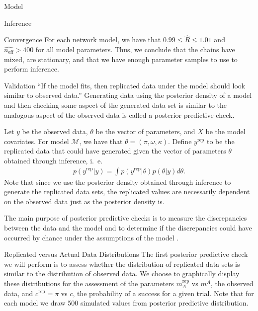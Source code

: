 \begin{chapter}{Model}
\begin{section}{Inference}
\begin{subsection}{Convergence}
    For each network model, we have that $0.99 \leq \hat{R} \leq 1.01$ and $\hat{n_{\text{eff}}} > 400$
    for all model parameters. Thus, we conclude that the chains have mixed, are stationary,
    and that we have enough parameter samples to use to perform inference.
  \end{subsection}

\end{section}

\begin{section}{Validation}
  ``If the model fits, then replicated data under the model should look similar
  to observed data.'' \cite{bda3}
  Generating data using the posterior density of a model and then
  checking some aspect of the generated data set is similar to the analogous aspect
  of the observed data is called a posterior predictive check.

  Let $y$ be the observed data, $\theta$ be the vector of parameters, and $X$ be the model covariates.
  For model $\mathcal{M}$, we have that $\theta = (\pi, \omega, \kappa)$. Define $y^{\text{rep}}$
  to be the replicated data that could have generated given the vector of parameters $\theta$
  obtained through inference, i.\ e.\
  \begin{align}\label{form:yrep}
    p(y^{\text{rep}} | y) = \int p(y^{\text{rep}}|\theta)p(\theta | y) d\theta.
  \end{align}
  Note that since we use the posterior density obtained through inference to generate the replicated data sets,
  the replicated values are necessarily dependent on the observed data just as the posterior density is.

  The main purpose of posterior predictive checks is to measure the discrepancies between the
  data and the model and to determine if the discrepancies could have occurred by chance under the assumptions
  of the model \cite{bda3, kruschke}.

  \begin{subsection}{Replicated versus Actual Data Distributions}
    The first posterior predictive check we will perform is to assess whether the
    distribution of replicated data sets is similar to the distribution of observed data.
    We choose to graphically display these distributions for the assessment of the parameters
    $m_A^\text{rep}$ vs $m^A$, the observed data, and $c^{\text{rep}} = \pi$ vs $c$, the probability of a success for a given trial.
    Note that for each model we draw 500 simulated values from posterior predictive distribution.


\end{subsection}
\end{section}
\end{chapter}
